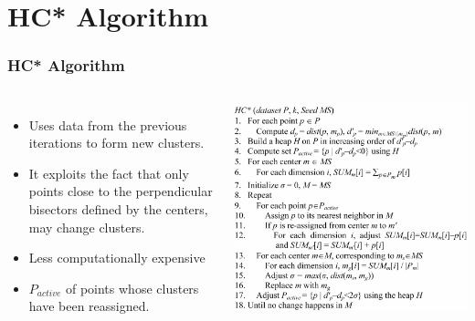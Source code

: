 \documentclass{beamer}
\begin{document}
\section{HC* Algorithm}
\begin{frame}
  \frametitle{HC* Algorithm}

  \begin{columns}

    \begin{itemize}
      \item Uses data from the previous iterations to form new clusters.
      \item  It exploits the fact that only points close to the perpendicular bisectors defined by the centers, may change clusters.
      \item Less computationally expensive
      \item $P_{active}$ of points whose clusters have been reassigned.

    \end{itemize}

    \includegraphics[width=1\textwidth]{Pic1.png}

  \end{columns}
\end{frame}

\end{document}
